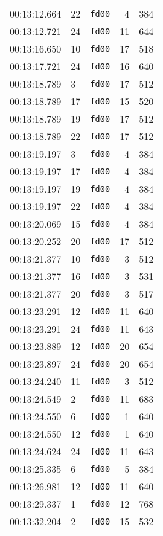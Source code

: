 \documentclass{article}
\begin{document}
\begin{longtable}{lllrr}
00:13:12.664 & 22 & \texttt{fd00} & 4 & 384 \\
00:13:12.721 & 24 & \texttt{fd00} & 11 & 644 \\
00:13:16.650 & 10 & \texttt{fd00} & 17 & 518 \\
00:13:17.721 & 24 & \texttt{fd00} & 16 & 640 \\
00:13:18.789 & 3 & \texttt{fd00} & 17 & 512 \\
00:13:18.789 & 17 & \texttt{fd00} & 15 & 520 \\
00:13:18.789 & 19 & \texttt{fd00} & 17 & 512 \\
00:13:18.789 & 22 & \texttt{fd00} & 17 & 512 \\
00:13:19.197 & 3 & \texttt{fd00} & 4 & 384 \\
00:13:19.197 & 17 & \texttt{fd00} & 4 & 384 \\
00:13:19.197 & 19 & \texttt{fd00} & 4 & 384 \\
00:13:19.197 & 22 & \texttt{fd00} & 4 & 384 \\
00:13:20.069 & 15 & \texttt{fd00} & 4 & 384 \\
00:13:20.252 & 20 & \texttt{fd00} & 17 & 512 \\
00:13:21.377 & 10 & \texttt{fd00} & 3 & 512 \\
00:13:21.377 & 16 & \texttt{fd00} & 3 & 531 \\
00:13:21.377 & 20 & \texttt{fd00} & 3 & 517 \\
00:13:23.291 & 12 & \texttt{fd00} & 11 & 640 \\
00:13:23.291 & 24 & \texttt{fd00} & 11 & 643 \\
00:13:23.889 & 12 & \texttt{fd00} & 20 & 654 \\
00:13:23.897 & 24 & \texttt{fd00} & 20 & 654 \\
00:13:24.240 & 11 & \texttt{fd00} & 3 & 512 \\
00:13:24.549 & 2 & \texttt{fd00} & 11 & 683 \\
00:13:24.550 & 6 & \texttt{fd00} & 1 & 640 \\
00:13:24.550 & 12 & \texttt{fd00} & 1 & 640 \\
00:13:24.624 & 24 & \texttt{fd00} & 11 & 643 \\
00:13:25.335 & 6 & \texttt{fd00} & 5 & 384 \\
00:13:26.981 & 12 & \texttt{fd00} & 11 & 640 \\
00:13:29.337 & 1 & \texttt{fd00} & 12 & 768 \\
00:13:32.204 & 2 & \texttt{fd00} & 15 & 532 \\

\end{longtable}
\end{document}
